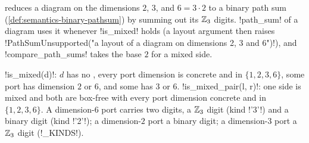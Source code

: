  reduces a diagram on the dimensions $2$, $3$, and $6=3\cdot2$ to a binary path sum (\cref{def:semantics-binary-pathsum}) by summing out its $\mathbb{Z}_3$ digits. \py!path_sum! of a diagram uses it whenever \py!is_mixed! holds (a layout argument then raises \py!PathSumUnsupported("a layout of a diagram on dimensions 2, 3 and 6")!), and \py!compare_path_sums! takes the base $2$ for a mixed side.

\begin{definition}\label{def:semantics-mixed}
\py!is_mixed(d)!: $d$ has no \bboxes{}, every port dimension is concrete and in $\{1,2,3,6\}$, some port has dimension $2$ or $6$, and some has $3$ or $6$. \py!is_mixed_pair(l, r)!: one side is mixed and both are box-free with every port dimension concrete and in $\{1,2,3,6\}$. A dimension-$6$ port carries two digits, a $\mathbb{Z}_3$ digit (kind \code!'3'!) and a binary digit (kind \code!'2'!); a dimension-$2$ port a binary digit; a dimension-$3$ port a $\mathbb{Z}_3$ digit (\py!_KINDS!).
\end{definition}

